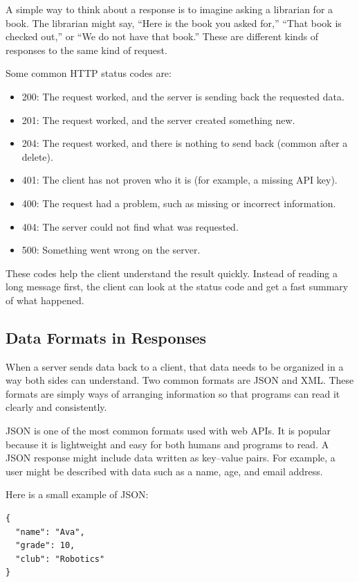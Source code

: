 A simple way to think about a response is to imagine asking a librarian
for a book. The librarian might say, ``Here is the book you asked
for,'' ``That book is checked out,'' or ``We do not have that
book.'' These are different kinds of responses to the same kind of
request.

Some common HTTP status codes are:

\begin{itemize}
    \item 200: The request worked, and the server is sending back the requested data.
    \item 201: The request worked, and the server created something new.
    \item 204: The request worked, and there is nothing to send back (common after a delete).
    \item 401: The client has not proven who it is (for example, a missing API key).
    \item 400: The request had a problem, such as missing or incorrect information.
    \item 404: The server could not find what was requested.
    \item 500: Something went wrong on the server.
\end{itemize}

These codes help the client understand the result quickly. Instead of
reading a long message first, the client can look at the status code
and get a fast summary of what happened.


\subsection{Data Formats in Responses}

When a server sends data back to a client, that data needs to be
organized in a way both sides can understand. Two common formats are
JSON and XML. These formats are simply ways of arranging information
so that programs can read it clearly and consistently.

JSON is one of the most common formats used with web APIs. It is
popular because it is lightweight and easy for both humans and
programs to read. A JSON response might include data written as
key--value pairs. For example, a user might be described with data
such as a name, age, and email address.

Here is a small example of JSON:

\begin{verbatim}
{
  "name": "Ava",
  "grade": 10,
  "club": "Robotics"
}
\end{verbatim}

